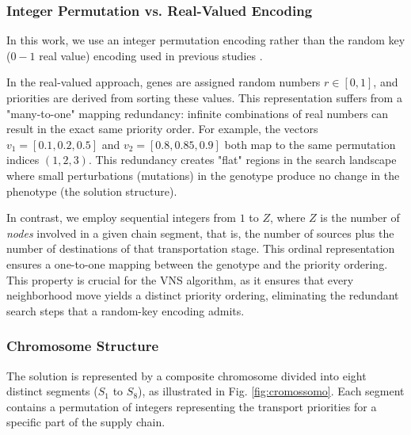 \documentclass[preprint,12pt,authoryear]{elsarticle}
\begin{document}
\subsubsection{Integer Permutation vs. Real-Valued Encoding}
In this work, we use an integer permutation encoding rather than the random key ($0-1$ real value) encoding used in previous studies \citep{rajabi2023, fathollahi2018}.

In the real-valued approach, genes are assigned random numbers $r \in [0, 1]$, and priorities are derived from sorting these values. This representation suffers from a "many-to-one" 
mapping redundancy: infinite combinations of real numbers can result in the exact same priority order. For example, the vectors $v_1 = [0.1, 0.2, 0.5]$ and $v_2 = [0.8, 0.85, 0.9]$ 
both map to the same permutation indices $(1, 2, 3)$. This redundancy creates "flat" regions in the search landscape where small perturbations (mutations) in the genotype produce no 
change in the phenotype (the solution structure).

In contrast, we employ sequential integers from $1$ to $Z$, where $Z$ is the number of \emph{nodes} involved in a given chain segment, that is, the number of sources plus the number
of destinations of that transportation stage. This ordinal representation ensures a one-to-one mapping between the genotype and the priority ordering. This property is crucial for the
VNS algorithm, as it ensures that every neighborhood move yields a distinct priority ordering, eliminating the redundant search steps that a random-key encoding admits.

\subsubsection{Chromosome Structure}
\label{subsubsec:chromosome}
The solution is represented by a composite chromosome divided into eight distinct segments ($S_1$ to $S_8$), as illustrated in Fig. \ref{fig:cromossomo}. Each segment contains a
permutation of integers representing the transport priorities for a specific part of the supply chain.
\end{document}
